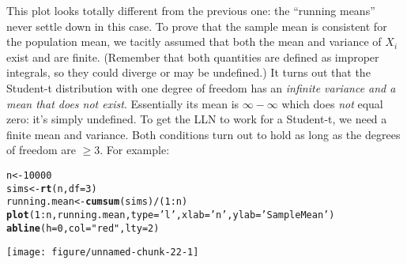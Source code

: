 \documentclass[addpoints,12pt]{exam}\usepackage[]{graphicx}\usepackage[]{color}
\makeatletter
\def\maxwidth{ %
  \ifdim\Gin@nat@width>\linewidth
    \linewidth
  \else
    \Gin@nat@width
  \fi
}
\newcommand{\hlnum}[1]{\textcolor[rgb]{0.686,0.059,0.569}{#1}}%
\newcommand{\hlstr}[1]{\textcolor[rgb]{0.192,0.494,0.8}{#1}}%
\newcommand{\hlopt}[1]{\textcolor[rgb]{0,0,0}{#1}}%
\newcommand{\hlstd}[1]{\textcolor[rgb]{0.345,0.345,0.345}{#1}}%
\newcommand{\hlkwb}[1]{\textcolor[rgb]{0.69,0.353,0.396}{#1}}%
\newcommand{\hlkwc}[1]{\textcolor[rgb]{0.333,0.667,0.333}{#1}}%
\newcommand{\hlkwd}[1]{\textcolor[rgb]{0.737,0.353,0.396}{\textbf{#1}}}%
\newenvironment{kframe}{%
 \def\at@end@of@kframe{}%
 \ifinner\ifhmode%
  \def\at@end@of@kframe{\end{minipage}}%
  \begin{minipage}{\columnwidth}%
 \fi\fi%
 \def\FrameCommand##1{\hskip\@totalleftmargin \hskip-\fboxsep
 \colorbox{shadecolor}{##1}\hskip-\fboxsep
     \hskip-\linewidth \hskip-\@totalleftmargin \hskip\columnwidth}%
 \MakeFramed {\advance\hsize-\width
   \@totalleftmargin\z@ \linewidth\hsize
   \@setminipage}}%
 {\par\unskip\endMakeFramed%
 \at@end@of@kframe}
\newenvironment{knitrout}{}{} %
\makeatother
\begin{document}
\begin{questions}
\begin{parts}
\begin{solution}
\begin{knitrout}
\end{knitrout}
This plot looks totally different from the previous one: the ``running means'' never settle down in this case. To prove that the sample mean is consistent for the population mean, we tacitly assumed that both the mean and variance of $X_i$ exist and are finite. (Remember that both quantities are defined as improper integrals, so they could diverge or may be undefined.) It turns out that the Student-t distribution with one degree of freedom has an \emph{infinite variance and a mean that does not exist}. Essentially its mean is $\infty - \infty$ which does \emph{not} equal zero: it's simply undefined. To get the LLN to work for a Student-t, we need a finite mean and variance. Both conditions turn out to hold as long as the degrees of freedom are $\geq 3$. For example:
\begin{knitrout}
\color{fgcolor}\begin{kframe}
\begin{alltt}
\hlstd{n} \hlkwb{<-} \hlnum{10000}
\hlstd{sims} \hlkwb{<-} \hlkwd{rt}\hlstd{(n,} \hlkwc{df} \hlstd{=} \hlnum{3}\hlstd{)}
\hlstd{running.mean} \hlkwb{<-} \hlkwd{cumsum}\hlstd{(sims)}\hlopt{/}\hlstd{(}\hlnum{1}\hlopt{:}\hlstd{n)}
\hlkwd{plot}\hlstd{(}\hlnum{1}\hlopt{:}\hlstd{n, running.mean,} \hlkwc{type} \hlstd{=} \hlstr{'l'}\hlstd{,} \hlkwc{xlab} \hlstd{=} \hlstr{'n'}\hlstd{,} \hlkwc{ylab} \hlstd{=} \hlstr{'Sample Mean'}\hlstd{)}
\hlkwd{abline}\hlstd{(}\hlkwc{h} \hlstd{=} \hlnum{0}\hlstd{,} \hlkwc{col} \hlstd{=} \hlstr{"red"}\hlstd{,} \hlkwc{lty} \hlstd{=} \hlnum{2}\hlstd{)}
\end{alltt}
\end{kframe}

{\centering \texttt{[image: figure/unnamed-chunk-22-1]} 

}



\end{knitrout}
  \end{solution}
    \end{parts}

\end{questions}
\end{document}
